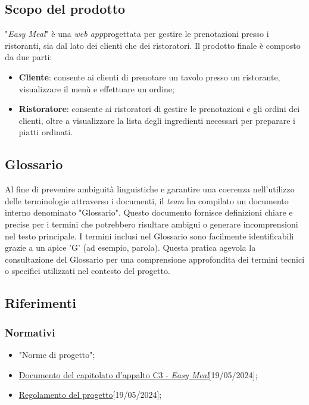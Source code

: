 \subsection{Scopo del prodotto}

"\textit{Easy Meal}" è una \textit{web app}\g progettata per gestire le
prenotazioni presso i ristoranti, sia dal lato dei clienti che dei ristoratori.
Il prodotto finale è composto da due parti:

\begin{itemize}
	\item \textbf{Cliente\g}: consente ai clienti di prenotare un tavolo presso un
	      ristorante, visualizzare il menù e effettuare un ordine\g;

	\item \textbf{Ristoratore}: consente ai ristoratori di gestire le
	      prenotazioni e gli ordini dei clienti, oltre a visualizzare la lista
	      degli ingredienti necessari per preparare i piatti ordinati.
\end{itemize}

\subsection{Glossario}

Al fine di prevenire ambiguità linguistiche e garantire una coerenza nell'utilizzo
delle terminologie attraverso i documenti, il \textit{team} ha compilato un documento
interno denominato "Glossario".
Questo documento fornisce definizioni chiare e precise per i termini che potrebbero
risultare ambigui o generare incomprensioni nel testo principale.
I termini inclusi nel Glossario sono facilmente identificabili grazie a un apice 'G'
(ad esempio, parola\g).
Questa pratica agevola la consultazione del Glossario per una comprensione approfondita
dei termini tecnici o specifici utilizzati nel contesto del progetto.

\subsection{Riferimenti}

\subsubsection{Normativi}
\begin{itemize}
	\item "Norme di progetto";
	\item 	\href{https://www.math.unipd.it/~tullio/IS-1/2023/Progetto/C3.pdf}
		{Documento del capitolato d'appalto C3 - \textit{Easy Meal}}[19/05/2024];
	\item \href{https://www.math.unipd.it/~tullio/IS-1/2023/Dispense/PD2.pdf}
		{Regolamento del progetto}[19/05/2024];
\end{itemize}

